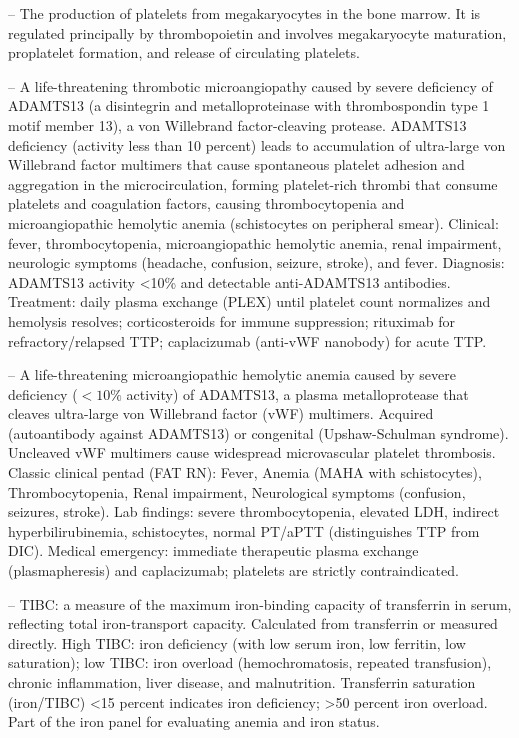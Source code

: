 -- The production of platelets from megakaryocytes in the bone marrow. It is regulated principally by thrombopoietin and involves megakaryocyte maturation, proplatelet formation, and release of circulating platelets.

-- A life-threatening thrombotic microangiopathy caused by severe deficiency of ADAMTS13 (a disintegrin and metalloproteinase with thrombospondin type 1 motif member 13), a von Willebrand factor-cleaving protease. ADAMTS13 deficiency (activity less than 10 percent) leads to accumulation of ultra-large von Willebrand factor multimers that cause spontaneous platelet adhesion and aggregation in the microcirculation, forming platelet-rich thrombi that consume platelets and coagulation factors, causing thrombocytopenia and microangiopathic hemolytic anemia (schistocytes on peripheral smear). Clinical: fever, thrombocytopenia, microangiopathic hemolytic anemia, renal impairment, neurologic symptoms (headache, confusion, seizure, stroke), and fever. Diagnosis: ADAMTS13 activity <10\% and detectable anti-ADAMTS13 antibodies. Treatment: daily plasma exchange (PLEX) until platelet count normalizes and hemolysis resolves; corticosteroids for immune suppression; rituximab for refractory/relapsed TTP; caplacizumab (anti-vWF nanobody) for acute TTP.

-- A life-threatening microangiopathic hemolytic anemia caused by severe deficiency ($<10\%$ activity) of ADAMTS13, a plasma metalloprotease that cleaves ultra-large von Willebrand factor (vWF) multimers. Acquired (autoantibody against ADAMTS13) or congenital (Upshaw-Schulman syndrome). Uncleaved vWF multimers cause widespread microvascular platelet thrombosis. Classic clinical pentad (FAT RN): Fever, Anemia (MAHA with schistocytes), Thrombocytopenia, Renal impairment, Neurological symptoms (confusion, seizures, stroke). Lab findings: severe thrombocytopenia, elevated LDH, indirect hyperbilirubinemia, schistocytes, normal PT/aPTT (distinguishes TTP from DIC). Medical emergency: immediate therapeutic plasma exchange (plasmapheresis) and caplacizumab; platelets are strictly contraindicated.

-- TIBC: a measure of the maximum iron-binding capacity of transferrin in serum, reflecting total iron-transport capacity. Calculated from transferrin or measured directly. High TIBC: iron deficiency (with low serum iron, low ferritin, low saturation); low TIBC: iron overload (hemochromatosis, repeated transfusion), chronic inflammation, liver disease, and malnutrition. Transferrin saturation (iron/TIBC) <15 percent indicates iron deficiency; >50 percent iron overload. Part of the iron panel for evaluating anemia and iron status.

